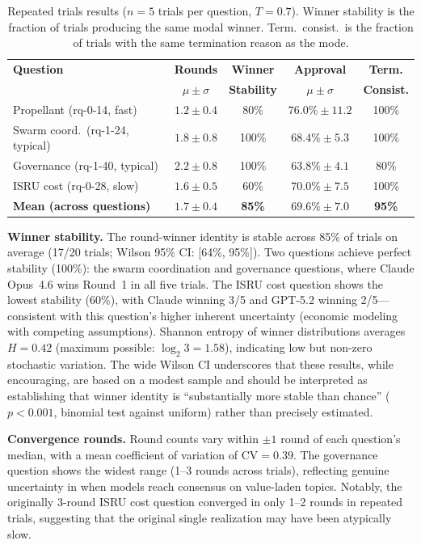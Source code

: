 \documentclass[11pt,a4paper]{article}
\begin{document}
\begin{table}[ht]
\centering
\caption{Repeated trials results ($n = 5$ trials per question, $T = 0.7$). Winner stability is the fraction of trials producing the same modal winner. Term.\ consist.\ is the fraction of trials with the same termination reason as the mode.}
\label{tab:repeated_trials}
\begin{tabular}{@{}lcccc@{}}
\toprule
\textbf{Question} & \textbf{Rounds} & \textbf{Winner} & \textbf{Approval} & \textbf{Term.} \\
 & $\mu \pm \sigma$ & \textbf{Stability} & $\mu \pm \sigma$ & \textbf{Consist.} \\
\midrule
Propellant (rq-0-14, fast) & $1.2 \pm 0.4$ & 80\% & $76.0\% \pm 11.2$ & 100\% \\
Swarm coord.\ (rq-1-24, typical) & $1.8 \pm 0.8$ & 100\% & $68.4\% \pm 5.3$ & 100\% \\
Governance (rq-1-40, typical) & $2.2 \pm 0.8$ & 100\% & $63.8\% \pm 4.1$ & 80\% \\
ISRU cost (rq-0-28, slow) & $1.6 \pm 0.5$ & 60\% & $70.0\% \pm 7.5$ & 100\% \\
\midrule
\textbf{Mean (across questions)} & $1.7 \pm 0.4$ & \textbf{85\%} & $69.6\% \pm 7.0$ & \textbf{95\%} \\
\bottomrule
\end{tabular}
\end{table}

\textbf{Winner stability.} The round-winner identity is stable across 85\% of trials on average (17/20 trials; Wilson 95\% CI: [64\%, 95\%]). Two questions achieve perfect stability (100\%): the swarm coordination and governance questions, where Claude Opus~4.6 wins Round~1 in all five trials. The ISRU cost question shows the lowest stability (60\%), with Claude winning 3/5 and GPT-5.2 winning 2/5---consistent with this question's higher inherent uncertainty (economic modeling with competing assumptions). Shannon entropy of winner distributions averages $H = 0.42$ (maximum possible: $\log_2 3 = 1.58$), indicating low but non-zero stochastic variation. The wide Wilson CI underscores that these results, while encouraging, are based on a modest sample and should be interpreted as establishing that winner identity is ``substantially more stable than chance'' ($p < 0.001$, binomial test against uniform) rather than precisely estimated.

\textbf{Convergence rounds.} Round counts vary within $\pm 1$ round of each question's median, with a mean coefficient of variation of $\text{CV} = 0.39$. The governance question shows the widest range (1--3 rounds across trials), reflecting genuine uncertainty in when models reach consensus on value-laden topics. Notably, the originally 3-round ISRU cost question converged in only 1--2 rounds in repeated trials, suggesting that the original single realization may have been atypically slow.
\end{document}
